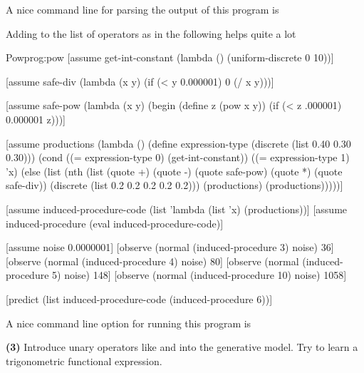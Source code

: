 \documentclass[11pt,reqno]{amsart}
\newcommand{\+}[1]{\ensuremath{{\mathbf{#1}}}}
\begin{document}
A nice command line for parsing the output of this program is 

Adding  to the list of operators as in the following helps quite a lot

\begin{code}{Pow}{prog:pow}
[assume get-int-constant
  (lambda () (uniform-discrete 0 10))]

[assume safe-div 
  (lambda (x y) (if (< y 0.000001) 0 (/ x y)))]

[assume safe-pow 
  (lambda (x y) (begin (define z (pow x y)) (if (< z .000001) 0.000001 z)))]

[assume productions 
  (lambda ()
    (define expression-type (discrete (list 0.40 0.30 0.30)))
      (cond
        ((= expression-type 0) (get-int-constant))
        ((= expression-type 1) 'x)
        (else
          (list
            (nth (list (quote +) (quote -) (quote safe-pow) (quote *) (quote safe-div))
                 (discrete (list 0.2 0.2 0.2 0.2 0.2)))
              (productions) (productions)))))]

[assume induced-procedure-code (list 'lambda (list 'x) (productions))]
[assume induced-procedure (eval induced-procedure-code)]

[assume noise 0.0000001]
[observe (normal (induced-procedure 3) noise) 36]
[observe (normal (induced-procedure 4) noise) 80]
[observe (normal (induced-procedure 5) noise) 148]
[observe (normal (induced-procedure 10) noise) 1058]

[predict (list induced-procedure-code (induced-procedure 6))]
\end{code}

A nice command line option for running this program is 

\fi


\vspace{1cm}
{\bf (3)} Introduce unary operators like  and  into the generative model.  Try to learn a trigonometric functional expression.  
\end{document}

